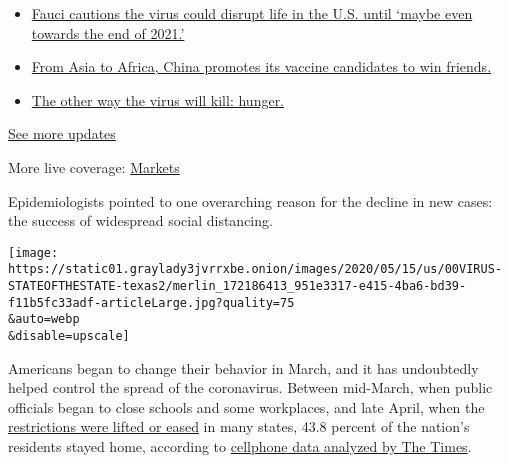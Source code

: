 \begin{itemize}
\tightlist
\item
  \href{https://www.nytimes3xbfgragh.onion/2020/09/11/world/covid-19-coronavirus.html?action=click\&pgtype=Article\&state=default\&region=MAIN_CONTENT_1\&context=storylines_live_updates\#link-dfb8a16}{Fauci
  cautions the virus could disrupt life in the U.S. until `maybe even
  towards the end of 2021.'}
\item
  \href{https://www.nytimes3xbfgragh.onion/2020/09/11/world/covid-19-coronavirus.html?action=click\&pgtype=Article\&state=default\&region=MAIN_CONTENT_1\&context=storylines_live_updates\#link-7104d154}{From
  Asia to Africa, China promotes its vaccine candidates to win friends.}
\item
  \href{https://www.nytimes3xbfgragh.onion/2020/09/11/world/covid-19-coronavirus.html?action=click\&pgtype=Article\&state=default\&region=MAIN_CONTENT_1\&context=storylines_live_updates\#link-393ad215}{The
  other way the virus will kill: hunger.}
\end{itemize}

\href{https://www.nytimes3xbfgragh.onion/2020/09/11/world/covid-19-coronavirus.html?action=click\&pgtype=Article\&state=default\&region=MAIN_CONTENT_1\&context=storylines_live_updates}{See
more updates}

More live coverage:
\href{https://www.nytimes3xbfgragh.onion/live/2020/09/11/business/stock-market-today-coronavirus?action=click\&pgtype=Article\&state=default\&region=MAIN_CONTENT_1\&context=storylines_live_updates}{Markets}

Epidemiologists pointed to one overarching reason for the decline in new
cases: the success of widespread social distancing.

\texttt{[image: https://static01.graylady3jvrrxbe.onion/images/2020/05/15/us/00VIRUS-STATEOFTHESTATE-texas2/merlin\_172186413\_951e3317-e415-4ba6-bd39-f11b5fc33adf-articleLarge.jpg?quality=75\\\&auto=webp\\\&disable=upscale]}

Americans began to change their behavior in March, and it has
undoubtedly helped control the spread of the coronavirus. Between
mid-March, when public officials began to close schools and some
workplaces, and late April, when the
\href{https://www.nytimes3xbfgragh.onion/interactive/2020/us/states-reopen-map-coronavirus.html}{restrictions
were lifted or eased} in many states, 43.8 percent of the nation's
residents stayed home, according to
\href{https://www.nytimes3xbfgragh.onion/interactive/2020/05/12/us/coronavirus-reopening-shutdown.html}{cellphone
data analyzed by The Times}.

